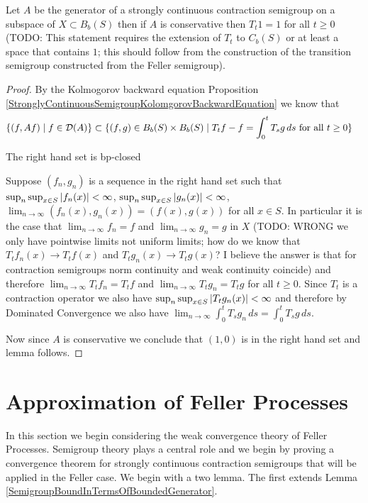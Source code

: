 \begin{lem}Let $A$ be the generator of a strongly continuous contraction semigroup on a subspace of $X \subset B_b(S)$ then if $A$ is conservative then
$T_t 1 = 1$ for all $t \geq 0$ (TODO: This statement requires the extension of $T_t$ to $C_b(S)$ or at least a space that contains $1$; this should follow from the construction of the transition semigroup constructed from the Feller semigroup).
\end{lem}
\begin{proof}
By the Kolmogorov backward equation Proposition \ref{StronglyContinuousSemigroupKolomgorovBackwardEquation} we know that 
\begin{align*}
\lbrace (f, Af) \mid f \in \mathcal{D}(A) \rbrace &\subset \lbrace (f,g) \in B_b(S) \times B_b(S) \mid T_t f- f = \int_0^t T_s g \, ds \text{ for all $t\geq 0$} \rbrace
\end{align*}
\begin{clm}The right hand set is bp-closed
\end{clm}
Suppose $(f_n, g_n)$ is a sequence in the right hand set such that $\sup_n \sup_{x\in S} \left \vert f_n(x) \right \vert < \infty$, $\sup_n \sup_{x\in S} \left \vert g_n(x) \right \vert < \infty$, $\lim_{n \to \infty} (f_n(x), g_n(x)) = (f(x), g(x))$  for all $x \in S$.  In particular it is the case that $\lim_{n \to \infty} f_n = f$ and $\lim_{n \to \infty} g_n = g$ in $X$ (TODO: WRONG we only have pointwise limits not uniform limits; how do we know that $T_t f_n(x) \to T_t f(x)$ and $T_t g_n(x) \to T_t g(x)$?  I believe the answer is that for contraction semigroups norm continuity and weak continuity coincide) and therefore $\lim_{n \to \infty} T_t f_n = T_t f$
and $\lim_{n \to \infty} T_t g_n = T_t g$ for all $t \geq 0$.  Since $T_t$ is a contraction operator we also have $\sup_n \sup_{x \in S} \left \vert T_t g_n(x) \right \vert < \infty$ and therefore by Dominated Convergence we also have $\lim_{n \to \infty} \int_0^t T_s g_n \, ds = \int_0^t T_s g \, ds$.  

Now since $A$ is conservative we conclude that $(1,0)$ is in the right hand set and lemma follows.
\end{proof}

\section{Approximation of Feller Processes}

In this section we begin considering the weak convergence theory of
Feller Processes.  Semigroup theory plays a central role and we begin by proving a convergence
theorem for strongly continuous contraction semigroups that will be applied in the Feller case.  We begin with a
two lemma. The first extends Lemma \ref{SemigroupBoundInTermsOfBoundedGenerator}.

